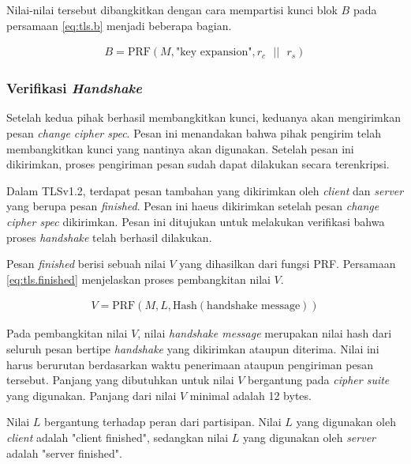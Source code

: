 Nilai-nilai tersebut dibangkitkan dengan cara mempartisi kunci blok $B$ pada persamaan \ref{eq:tls.b} menjadi beberapa bagian.

\begin{equation}
  \label{eq:tls.b}
  \begin{array}{l}
    B = \text{PRF}(M, \text{"key expansion"}, r_c \text{ }||\text{ }r_s)
  \end{array}
\end{equation}

\subsubsection{Verifikasi \emph{Handshake}}
Setelah kedua pihak berhasil membangkitkan kunci, keduanya akan mengirimkan pesan \emph{change cipher spec}. Pesan ini menandakan bahwa pihak pengirim telah membangkitkan kunci yang nantinya akan digunakan. Setelah pesan ini dikirimkan, proses pengiriman pesan sudah dapat dilakukan secara terenkripsi. 

Dalam TLSv1.2, terdapat pesan tambahan yang dikirimkan oleh \emph{client} dan \emph{server} yang berupa pesan \emph{finished}. Pesan ini haeus dikirimkan setelah pesan \emph{change cipher spec} dikirimkan. Pesan ini ditujukan untuk melakukan verifikasi bahwa proses \emph{handshake} telah berhasil dilakukan.

Pesan \emph{finished} berisi sebuah nilai $V$ yang dihasilkan dari fungsi PRF. Persamaan \ref{eq:tls.finished} menjelaskan proses pembangkitan nilai $V$.

\begin{equation}
  \label{eq:tls.finished}
  \begin{array}{l}
    V = \text{PRF}(M, L, \text{Hash}(\text{handshake message}))
  \end{array}
\end{equation}

Pada pembangkitan nilai $V$, nilai \emph{handshake message} merupakan nilai hash dari seluruh pesan bertipe \emph{handshake} yang dikirimkan ataupun diterima. Nilai ini harus berurutan berdasarkan waktu penerimaan ataupun pengiriman pesan tersebut. Panjang yang dibutuhkan untuk nilai $V$ bergantung pada \emph{cipher suite} yang digunakan. Panjang dari nilai $V$ minimal adalah 12 bytes.

Nilai $L$ bergantung terhadap peran dari partisipan. Nilai $L$ yang digunakan oleh \emph{client} adalah "client finished", sedangkan nilai $L$ yang digunakan oleh \emph{server} adalah "server finished".

